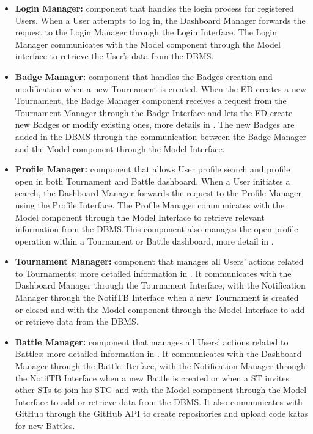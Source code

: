 \begin{itemize}
    \item \textbf{Login Manager:} component that handles the login process for registered Users. When a User attempts to log in, the Dashboard Manager forwards the request to the Login Manager through the Login Interface. The Login Manager communicates with the Model component through the Model interface to retrieve the User's data from the DBMS.
    \item \textbf{Badge Manager:} component that handles the Badges creation and modification when a new Tournament is created. When the ED creates a new Tournament, the Badge Manager component receives a request from the Tournament Manager through the Badge Interface and lets the ED create new Badges or modify existing ones, more details in . The new Badges are added in the DBMS through the communication between the Badge Manager and the Model component through the Model Interface.
    \item \textbf{Profile Manager:} component that allows User profile search and profile open in both Tournament and Battle dashboard. When a User initiates a search, the Dashboard Manager forwards the request to the Profile Manager using the Profile Interface. The Profile Manager communicates with the Model component through the Model Interface to retrieve relevant information from the DBMS.This component also manages the open profile operation within a Tournament or Battle dashboard, more detail in .
    \item \textbf{Tournament Manager:} component that manages all Users' actions related to Tournaments; more detailed information in . It communicates with the Dashboard Manager through the Tournament Interface, with the Notification Manager through the NotifTB Interface when a new Tournament is created or closed and with the Model component through the Model Interface to add or retrieve data from the DBMS.
    \item \textbf{Battle Manager:} component that manages all Users' actions related to Battles; more detailed information in . It communicates with the Dashboard Manager through the Battle iIterface, with the Notification Manager through the NotifTB Interface when a new Battle is created or when a ST invites other STs to join his STG and with the Model component through the Model Interface to add or retrieve data from the DBMS. It also communicates with GitHub through the GitHub API to create repositories and upload code katas for new Battles.

\end{itemize}
